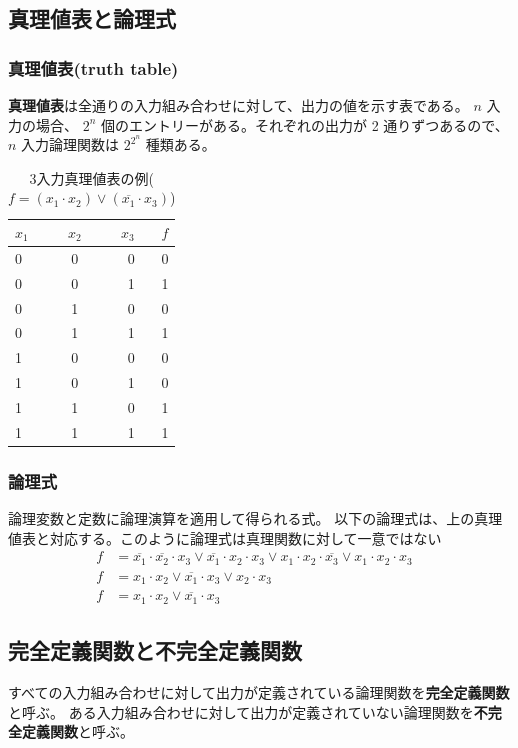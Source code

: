 \documentclass[a4j,10pt,oneside,openany,fleqn]{jsbook}
\begin{document}
\subsection{真理値表と論理式}

\subsubsection{真理値表(truth table)}
\textbf{真理値表}は全通りの入力組み合わせに対して、出力の値を示す表である。
$n$ 入力の場合、 $2^n$ 個のエントリーがある。それぞれの出力が 2 通りずつあるので、$n$ 入力論理関数は $2^{2^n}$ 種類ある。
\begin{table}[htb]
  \begin{center}
    \begin{tabular}{lcr|r} 
      $x_1$ & $x_2$ & $x_3$ & $f$ \\ \hline 
      0 & 0 & 0 & 0 \\
      0 & 0 & 1 & 1 \\
      0 & 1 & 0 & 0 \\
      0 & 1 & 1 & 1 \\
      1 & 0 & 0 & 0 \\
      1 & 0 & 1 & 0 \\
      1 & 1 & 0 & 1 \\
      1 & 1 & 1 & 1 \\
    \end{tabular}
  \end{center}
  \caption{3入力真理値表の例($f = (x_1 \cdot x_2) \vee (\overline{x_1} \cdot x_3)$)}
\end{table}

\newpage

\subsubsection{論理式}
論理変数と定数に論理演算を適用して得られる式。
以下の論理式は、上の真理値表と対応する。このように論理式は真理関数に対して一意ではない
\begin{align*}
f &= \overline{x_1} \cdot \overline{x_2} \cdot x_3 \vee \overline{x_1} \cdot x_2 \cdot x_3 \vee x_1 \cdot x_2 \cdot \overline{x_3}  \vee x_1 \cdot x_2 \cdot x_3 &\\
f &= x_1 \cdot x_2 \vee \overline{x_1} \cdot x_3 \vee x_2 \cdot x_3 &\\
f &= x_1 \cdot x_2 \vee \overline{x_1} \cdot x_3 &
\end{align*}
\subsection{完全定義関数と不完全定義関数}
すべての入力組み合わせに対して出力が定義されている論理関数を\textbf{完全定義関数}と呼ぶ。
ある入力組み合わせに対して出力が定義されていない論理関数を\textbf{不完全定義関数}と呼ぶ。
\end{document}
